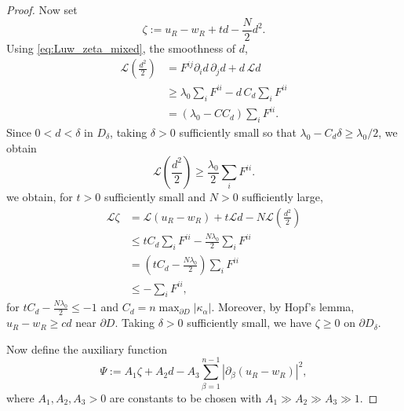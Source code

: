 \documentclass[reqno,a4paper]{amsart}
\numberwithin{equation}{section}
\begin{document}
\begin{proof}
		Now set
		\[
		\zeta:=u_R-w_R+td-\frac{N}{2}d^2.
		\]
		Using \eqref{eq:Luw_zeta_mixed}, the smoothness of $d$, 
		$$
		\begin{aligned}
			\mathcal L\left(\frac{d^2}{2}\right)
			&= F^{ij}\partial_i d\,\partial_j d + d\,\mathcal L d \\
			&\ge \lambda_0\sum_i F^{ii} - d\,C_d\sum_i F^{ii} \\
			&= (\lambda_0 - C C_d)\sum_i F^{ii}.
		\end{aligned}$$
		Since $0<d<\delta$ in $D_\delta$, taking $\delta>0$ sufficiently small so that $\lambda_0 - C_d\delta \ge \lambda_0/2$, we obtain
		\begin{equation}
			\mathcal L\left(\frac{d^2}{2}\right) \ge \frac{\lambda_0}{2}\sum_i F^{ii}.
		\end{equation}
		we obtain, for $t>0$ sufficiently small and $N>0$ sufficiently large,
		\begin{equation}
			\begin{aligned}
				\mathcal{L}\zeta
				&= \mathcal{L}(u_R-w_R) + t\mathcal{L}d - N\mathcal{L}\left(\frac{d^2}{2}\right) \\
				&\le tC_d\sum_i F^{ii} - \frac{N\lambda_0}{2}\sum_i F^{ii} \\
				&= \left(tC_d-\frac{N\lambda_0}{2}\right)\sum_i F^{ii} \\
				&\le  -\sum_iF^{ii},
			\end{aligned}
			\label{eq:Lzeta_mixed}
		\end{equation}
		for $tC_d-\frac{N\lambda_0}{2}\leq -1$ and $C_d = n\max_{\partial D}|\kappa_\alpha|$. 
		Moreover, by Hopf's lemma, $u_R-w_R\ge cd$ near $\partial D$. Taking $\delta>0$ sufficiently small, we have $\zeta\ge0$ on $\partial D_\delta$.
		
		Now define the auxiliary function
		\[
		\Psi := A_1\zeta + A_2 d - A_3\sum_{\beta=1}^{n-1}|\partial_\beta(u_R-w_R)|^2,
		\]
		where $A_1,A_2,A_3>0$ are constants to be chosen with $A_1\gg A_2\gg A_3\gg 1$.
		

\end{proof}
\end{document}

